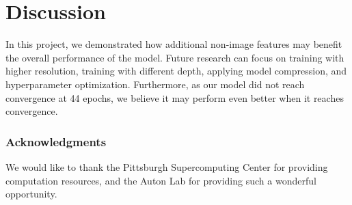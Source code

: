 \documentclass{article}
\begin{document}
\section{Discussion}
\label{Conc}
In this project, we demonstrated how additional non-image features may benefit the overall performance of the model.
Future research can focus on training with higher resolution, training with different depth, applying model compression, and hyperparameter optimization. Furthermore, as our model did not reach convergence at 44 epochs, we believe it may perform even better when it reaches convergence. 

\subsubsection*{Acknowledgments}

We would like to thank the Pittsburgh Supercomputing Center for providing computation resources, and the Auton Lab for providing such a wonderful opportunity.



\end{document}
